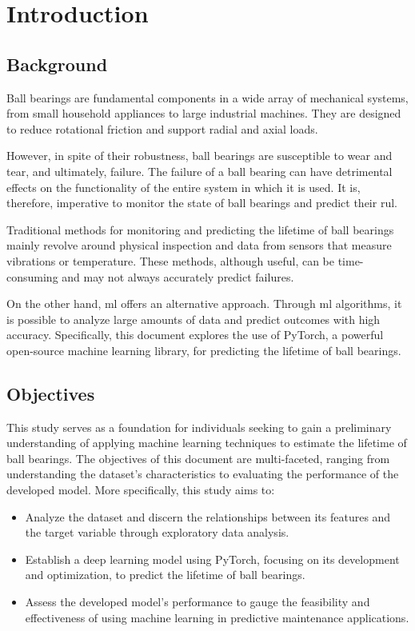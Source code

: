 \chapter{Introduction}

\section{Background}

Ball bearings are fundamental components in a wide array of mechanical systems, from small household appliances to large industrial machines. They are designed to reduce rotational friction and support radial and axial loads. 

However, in spite of their robustness, ball bearings are susceptible to wear and tear, and ultimately, failure. The failure of a ball bearing can have detrimental effects on the functionality of the entire system in which it is used. It is, therefore, imperative to monitor the state of ball bearings and predict their \ac{rul}.

Traditional methods for monitoring and predicting the lifetime of ball bearings mainly revolve around physical inspection and data from sensors that measure vibrations or temperature. These methods, although useful, can be time-consuming and may not always accurately predict failures.

On the other hand, \ac{ml} offers an alternative approach. Through \ac{ml} algorithms, it is possible to analyze large amounts of data and predict outcomes with high accuracy. Specifically, this document explores the use of PyTorch, a powerful open-source machine learning library, for predicting the lifetime of ball bearings.


\section{Objectives}

This study serves as a foundation for individuals seeking to gain a preliminary understanding of applying machine learning techniques to estimate the lifetime of ball bearings. The objectives of this document are multi-faceted, ranging from understanding the dataset's characteristics to evaluating the performance of the developed model. More specifically, this study aims to:

\begin{itemize}
    \item Analyze the dataset and discern the relationships between its features and the target variable through exploratory data analysis.
    \item Establish a deep learning model using PyTorch, focusing on its development and optimization, to predict the lifetime of ball bearings.
    \item Assess the developed model's performance to gauge the feasibility and effectiveness of using machine learning in predictive maintenance applications.
\end{itemize}

